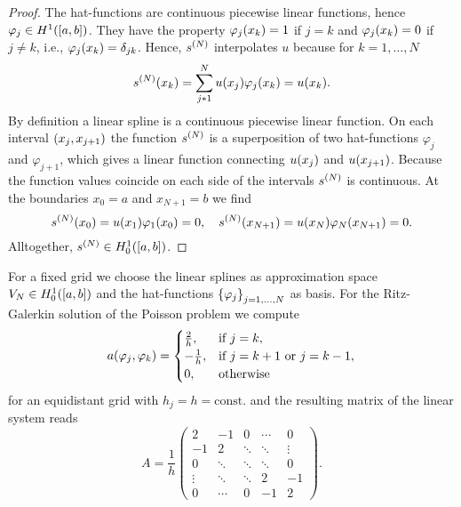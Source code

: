 \begin{proof}
    The hat-functions are continuous piecewise linear functions, hence \(\varphi_j \in H^1\parentheses*{\brackets*{a, b}}\).
    They have the property \(\varphi_j\parentheses*{x_k} = 1\) if \(j = k\) and \(\varphi_j\parentheses*{x_k} = 0\) if \(j \ne k\), i.e., \(\varphi_j\parentheses*{x_k} = \delta_{jk}\).
    Hence, \(s^{\parentheses*{N}}\) interpolates \(u\) because for \(k = 1, \ldots, N\)
    \[
        s^{\parentheses*{N}}\parentheses*{x_k} = \sum_{j * 1}^N u\parentheses*{x_j}\varphi_j\parentheses*{x_k} = u\parentheses*{x_k}.
    \]
    By definition a linear spline is a continuous piecewise linear function.
    On each interval \(\parentheses*{x_j, x_{j + 1}}\) the function \(s^{\parentheses*{N}}\) is a superposition of two hat-functions \(\varphi_j\) and \(\varphi_{j + 1}\), which gives a linear function connecting \(u\parentheses*{x_j}\) and \(u\parentheses*{x_{j + 1}}\).
    Because the function values coincide on each side of the intervals \(s^{\parentheses*{N}}\) is continuous.
    At the boundaries \(x_0 = a\) and \(x_{N + 1} = b\) we find
    \[
        s^{\parentheses*{N}}\parentheses*{x_0} = u\parentheses*{x_1}\varphi_1\parentheses*{x_0} = 0, \quad s^{\parentheses*{N}}\parentheses*{x_{N + 1}} = u\parentheses*{x_N}\varphi_N\parentheses*{x_{N + 1}} = 0.
    \]
    Alltogether, \(s^{\parentheses*{N}} \in H_0^1\parentheses*{\brackets*{a, b}}\).
\end{proof}

For a fixed grid we choose the linear splines as approximation space \(V_N \in H_0^1\parentheses*{\brackets*{a, b}}\) and the hat-functions \(\braces*{\varphi_j}_{j = 1, \ldots, N}\) as basis.
For the Ritz-Galerkin solution of the Poisson problem we compute
\[
    a\parentheses*{\varphi_j, \varphi_k} = \begin{cases}
        \frac{2}{h}, & \text{if }j = k,\\
        -\frac{1}{h}, & \text{if }j = k + 1\text{ or }j = k - 1,\\
        0, & \text{otherwise}
    \end{cases}
\]
for an equidistant grid with \(h_j = h = \text{const.}\) and the resulting matrix of the linear system reads
\[
    A = \frac{1}{h}\begin{pmatrix}
        2 & -1 & 0 & \cdots & 0\\
        -1 & 2 & \ddots & \ddots & \vdots\\
        0 & \ddots & \ddots & \ddots & 0\\
        \vdots & \ddots & \ddots & 2 & -1\\
        0 & \cdots & 0 & -1 & 2
    \end{pmatrix}.
\]

